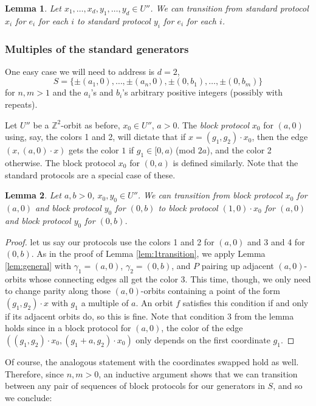 \documentclass[12pt]{article}
\newcommand{\0}{\varnothing}
\newcommand{\Z}{\mathbb{Z}}
\newtheorem{lemma}{Lemma}
\begin{document}
\begin{lemma}
Let $x_1,\ldots,x_d,y_1,\ldots,y_d \in U''$. We can transition from standard protocol $x_i$ for $e_i$ for each $i$ to standard protocol $y_i$ for $e_i$ for each $i$.
\end{lemma}

\subsubsection{Multiples of the standard generators}\label{subsubsec:block}

One easy case we will need to address is $d = 2$, $$S = \{\pm (a_1,0),\ldots,\pm (a_n,0), \pm(0,b_1),\ldots,\pm(0,b_m)\}$$ for $n,m > 1$ and the $a_i$'s and $b_i$'s arbitrary positive integers (possibly with repeats). 

Let $U''$ be a $\Z^2$-orbit as before, $x_0 \in U''$, $a > 0$. The \textit{block protocol} $x_0$ for $(a,0)$ using, say, the colors 1 and 2, will dictate that if $x = (g_1,g_2) \cdot x_0$, then the edge $(x,(a,0) \cdot x)$ gets the color $1$ if $g_1 \in [0,a)$ (mod $2a$), and the color 2 otherwise. The block protocol $x_0$ for $(0,a)$ is defined similarly. Note that the standard protocols are a special case of these.

\begin{lemma}\label{lem:blocktrans}
Let $a,b > 0$, $x_0,y_0 \in U''$. We can transition from block protocol $x_0$ for $(a,0)$ and block protocol $y_0$ for $(0,b)$ to block protocol $(1,0) \cdot x_0$ for $(a,0)$ and block protocol $y_0$ for $(0,b)$.
\end{lemma}
\begin{proof}
let us say our protocols use the colors 1 and 2 for $(a,0)$ and 3 and 4 for $(0,b)$. As in the proof of Lemma \ref{lem:1transition}, we apply Lemma \ref{lem:general} with $\gamma_1 = (a,0)$, $\gamma_2 = (0,b)$, and $P$ pairing up adjacent $(a,0)$-orbits whose connecting edges all get the color 3. This time, though, we only need to change parity along those $(a,0)$-orbits containing a point of the form $(g_1,g_2) \cdot x$ with $g_1$ a multiple of $a$. An orbit $f$ satisfies this condition if and only if its adjacent orbits do, so this is fine. Note that condition 3 from the lemma holds since in a block protocol for $(a,0)$, the color of the edge $((g_1,g_2) \cdot x_0, (g_1+a,g_2) \cdot x_0)$ only depends on the first coordinate $g_1$.
\end{proof}

Of course, the analogous statement with the coordinates swapped hold as well. Therefore, since $n,m > 0$, an inductive argument shows that we can transition between any pair of sequences of block protocols for our generators in $S$, and so we conclude:
\end{document}

